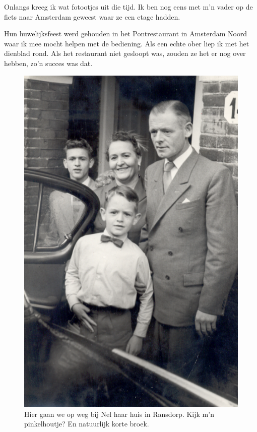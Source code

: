 \documentclass[12pt,twoside, openright]{memoir}
\begin{document}
Onlangs kreeg ik wat fotootjes uit die tijd. Ik ben nog eens met m’n vader op de fiets naar Amsterdam geweest waar ze een etage hadden. 

Hun huwelijksfeest werd gehouden in het Pontrestaurant in Amsterdam Noord waar ik mee mocht helpen met de bediening. Als een echte ober liep ik met het dienblad rond. Als het restaurant niet gesloopt was, zouden ze het er nog over hebben, zo’n succes was dat.

\begin{figure}
\includegraphics[width=\textwidth]{img/ch5/trouwengn}
\caption*{\footnotesize Hier gaan we op weg bij Nel haar huis in Ransdorp. Kijk m’n pinkelhoutje? En natuurlijk korte broek.}
\end{figure}
\end{document}
